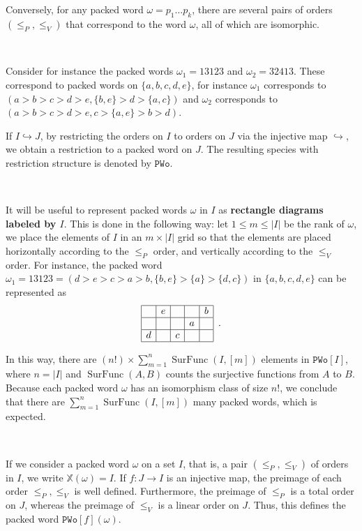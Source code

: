 \documentclass[12pt, reqno]{amsart}
\theoremstyle{definition}
\DeclareMathOperator{\sFunc}{\mathrm{SurFunc}}
\begin{document}
Conversely, for any packed word $\omega = p_1\dots p_k$, there are several pairs of orders $(\leq_P, \leq_V)$ that correspond to the word $\omega $, all of which are isomorphic.

\

Consider for instance the packed words $\omega_1 = 13123$ and $\omega_2 = 32413$.
These correspond to packed words on $\{a, b, c, d, e\}$, for instance $\omega_1$ corresponds to $(a > b > c > d > e, \{b, e\} > d > \{a, c\})$ and $\omega_2$ corresponds to $(a > b > c > d > e, c > \{a, e\} >  b > d)$.


If $I \hookrightarrow J$, by restricting the orders on $I$ to orders on $J$ via the injective map $\hookrightarrow $, we obtain a restriction to a packed word on $J$.
The resulting species with restriction structure is denoted by $\mathtt{PWo}$.

\

It will be useful to represent packed words $\omega $ in $I$ as \textbf{rectangle diagrams labeled by $I$}.
This is done in the following way: let $1\leq m \leq |I|$ be the rank of $\omega$, we place the elements of $I$ in an $m \times |I|$ grid so that the elements are placed horizontally according to the $\leq_P$ order, and vertically according to the $\leq_V$ order.
For instance, the packed word $\omega_1 = 13123 = ( d > e > c > a > b, \{b, e\} > \{a\} > \{d, c\})$ in $\{a, b, c, d, e\}$ can be represented as 
\begin{equation}
\begin{array}{|c|c|c|c|c|}
	\hline   & e &   &   & b \\
    \hline   &   &   & a &   \\
    \hline d &   & c &   &   \\
    \hline 
\end{array}\, \, \, .
\end{equation}




In this way, there are $(n!) \times \sum_{m = 1}^n \sFunc(I, [m])$ elements in $\mathtt{PWo}[I]$, where $n = |I|$ and $\sFunc(A, B)$ counts the surjective functions from $A$ to $B$.
Because each packed word $\omega $ has an isomorphism class of size $n!$, we conclude that there are $ \sum_{m = 1}^n \sFunc(I, [m])$ many packed words, which is expected.

\

\label{defin:pwo}
If we consider a packed word $\omega$ on a set $I$, that is, a pair $(\leq_P, \leq_V) $ of orders in $I$, we write $\mathbb{X}(\omega) = I$.
If $f:J \to I $ is an injective map, the preimage of each order $\leq_P, \leq_V$ is well defined.
Furthermore, the preimage of $\leq_P$ is a total order on $J$, whereas the preimage of $\leq_V$ is a linear order on $J$.
Thus, this defines the packed word $\mathtt{PWo}[f](\omega )$.
\end{document}
